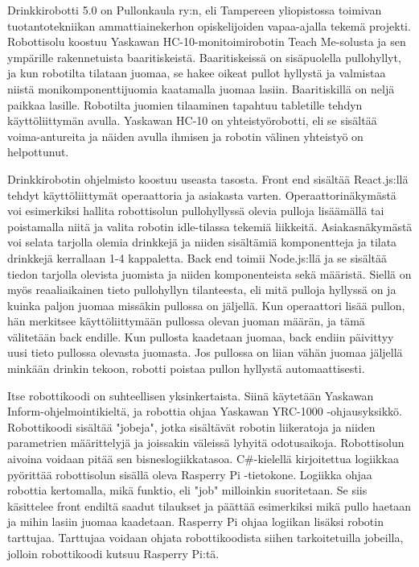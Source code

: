 Drinkkirobotti 5.0 on Pullonkaula ry:n, eli Tampereen yliopistossa toimivan tuotantotekniikan ammattiainekerhon opiskelijoiden vapaa-ajalla tekemä projekti. Robottisolu koostuu Yaskawan HC-10-monitoimirobotin Teach Me-solusta ja sen ympärille rakennetuista baaritiskeistä. Baaritiskeissä on sisäpuolella pullohyllyt, ja kun robotilta tilataan juomaa, se hakee oikeat pullot hyllystä ja valmistaa niistä monikomponenttijuomia kaatamalla juomaa lasiin. Baaritiskillä on neljä paikkaa lasille. Robotilta juomien tilaaminen tapahtuu tabletille tehdyn käyttöliittymän avulla. Yaskawan HC-10 on yhteistyörobotti, eli se sisältää voima-antureita ja näiden avulla ihmisen ja robotin välinen yhteistyö on helpottunut. \cite{Pullonkaula2020}

Drinkkirobotin ohjelmisto koostuu useasta tasosta. Front end sisältää React.js:llä tehdyt käyttöliittymät operaattoria ja asiakasta varten. Operaattorinäkymästä voi esimerkiksi hallita robottisolun pullohyllyssä olevia pulloja lisäämällä tai poistamalla niitä ja valita robotin idle-tilassa tekemiä liikkeitä. Asiakasnäkymästä voi selata tarjolla olemia drinkkejä ja niiden sisältämiä komponentteja ja tilata drinkkejä kerrallaan 1-4 kappaletta. Back end toimii Node.js:llä ja se sisältää tiedon tarjolla olevista juomista ja niiden komponenteista sekä määristä. Siellä on myös reaaliaikainen tieto pullohyllyn tilanteesta, eli mitä pulloja hyllyssä on ja kuinka paljon juomaa missäkin pullossa on jäljellä. Kun operaattori lisää pullon, hän merkitsee käyttöliittymään pullossa olevan juoman määrän, ja tämä välitetään back endille. Kun pullosta kaadetaan juomaa, back endiin päivittyy uusi tieto pullossa olevasta juomasta. Jos pullossa on liian vähän juomaa jäljellä minkään drinkin tekoon, robotti poistaa pullon hyllystä automaattisesti.

Itse robottikoodi on suhteellisen yksinkertaista. Siinä käytetään Yaskawan Inform-ohjelmointikieltä, ja robottia ohjaa Yaskawan YRC-1000 -ohjausyksikkö. Robottikoodi sisältää "jobeja", jotka sisältävät robotin liikeratoja ja niiden parametrien määrittelyjä ja joissakin väleissä lyhyitä odotusaikoja. Robottisolun aivoina voidaan pitää sen bisneslogiikkatasoa. C\#-kielellä kirjoitettua logiikkaa pyörittää robottisolun sisällä oleva Rasperry Pi -tietokone. Logiikka ohjaa robottia kertomalla, mikä funktio, eli "job" milloinkin suoritetaan. Se siis käsittelee front endiltä saadut tilaukset ja päättää esimerkiksi mikä pullo haetaan ja mihin lasiin juomaa kaadetaan. Rasperry Pi ohjaa logiikan lisäksi robotin tarttujaa. Tarttujaa voidaan ohjata robottikoodista siihen tarkoitetuilla jobeilla, jolloin robottikoodi kutsuu Rasperry Pi:tä.

